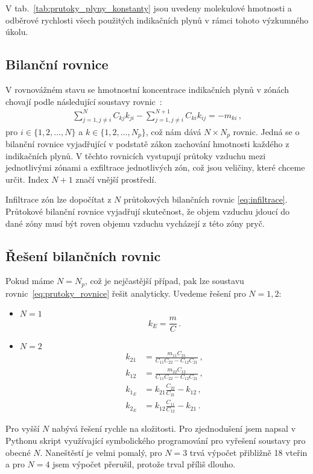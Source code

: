 V tab.~\ref{tab:prutoky_plyny_konstanty} jsou uvedeny molekulové hmotnosti a odběrové rychlosti všech použitých indikačních plynů v rámci tohoto výzkumného úkolu.  
\subsection{Bilanční rovnice}
V rovnovážném stavu se hmotnostní koncentrace indikačních plynů v zónách chovají podle následující soustavy rovnic~\cite{japonci}:
\begin{align}
    \sum_{j=1,j\neq i}^{N}C_{kj}k_{ji}-\sum_{j=1,j\neq i}^{N+1}C_{ki}k_{ij}=-m_{ki}\,,
    \label{eq:prutoky_rovnice}
\end{align}
pro $i\in\{1,2, \ldots, N\}$ a $k\in\{1,2,\ldots, N_p\}$, což nám dává $N\times N_p$ rovnic. Jedná se o bilanční rovnice vyjadřující v podstatě zákon zachování hmotnosti každého z indikačních plynů. V těchto rovnicích vystupují průtoky vzduchu mezi jednotlivými zónami a exfiltrace jednotlivých zón, což jsou veličiny, které chceme určit. Index $N+1$ značí vnější prostředí.

Infiltrace zón lze dopočítat z $N$ průtokových bilančních rovnic \eqref{eq:infiltrace}. Průtokové bilanční rovnice vyjadřují skutečnost, že objem vzduchu jdoucí do dané zóny musí být roven objemu vzduchu vycházejí z této zóny pryč. 

\subsection{Řešení bilančních rovnic}
Pokud máme $N=N_p$, což je nejčastější případ, pak lze soustavu rovnic~\eqref{eq:prutoky_rovnice} řešit analyticky. Uvedeme řešení pro $N=1, 2$:
\begin{itemize}
    \item $N=1$
        \begin{equation}
            k_E=\frac{m}{C}\,.
        \end{equation}
    \item $N=2$
        \begin{align}
            k_{21}&=\frac{m_{11}C_{21}}{C_{11}C_{22}-C_{12}C_{21}}\,, \\
            k_{12}&=\frac{m_{22}C_{12}}{C_{11}C_{22}-C_{12}C_{21}}\,, \\
            k_{1_E}&=k_{21}\frac{C_{22}}{C_{21}}-k_{12}\,,\\
            k_{2_E}&=k_{12}\frac{C_{11}}{C_{12}}-k_{21}\,.
        \end{align}
\end{itemize}
Pro vyšší $N$ nabývá řešení rychle na složitosti. Pro zjednodušení jsem napsal v Pythonu skript využívající symbolického programování pro vyřešení soustavy pro obecné $N$. Naneštěstí je velmi pomalý, pro $N=3$ trvá výpočet přibližně 18 vteřin a pro $N=4$ jsem výpočet přerušil, protože trval příliš dlouho.

